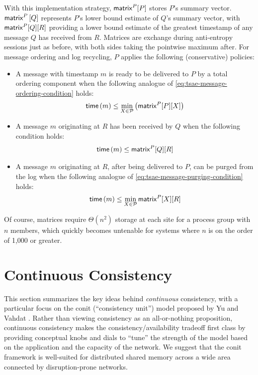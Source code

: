 \documentclass[]             %
{NASA}                       %
\theoremstyle{definition}
\begin{document}
With this implementation strategy, $\mathsf{matrix}^{P}[P]$ stores $P$'s
summary vector. $\mathsf{matrix}^{P}\left[Q\right]$ represents $P$'s lower
bound estimate of $Q$'s summary vector, with $\mathsf{matrix}^{P}[Q][R]$
providing a lower bound estimate of the greatest timestamp of any
message $Q$ has received from $R$. Matrices are exchange during
anti-entropy sessions just as before, with both sides taking the
pointwise maximum after. For message ordering and log recycling, $P$
applies the following (conservative) policies:
\begin{itemize}
\item A message with timestamp $m$ is ready to be delivered to $P$ by a total
  ordering component when the following analogue of \eqref{eq:tsae-message-ordering-condition} holds:
  \begin{equation}
    \mathsf{time}\left(m\right) \leq \min_{X \in \mathcal{P}} \left(\mathsf{matrix}^{P}[P][X]\right)
  \end{equation}
\item A message $m$ originating at $R$ has been
  received by $Q$ when the following condition holds:
    \begin{equation}
      \mathsf{time}\left(m\right) \leq \mathsf{matrix}^{P}[Q][R]
    \end{equation}
\item A message $m$ originating at $R$, after being delivered to $P$,
  can be purged from the log when the following analogue of
  \eqref{eq:tsae-message-purging-condition} holds:
    \begin{equation}
      \mathsf{time}\left(m\right) \leq \min_{X \in \mathcal{P}}\mathsf{matrix}^{P}[X][R]
    \end{equation}
\end{itemize}

Of course, matrices require $\Theta(n^2)$ storage at each site for a
process group with $n$ members, which quickly becomes untenable for
systems where $n$ is on the order of 1,000 or greater.

\section{Continuous Consistency}
\label{sec:continuous-consistency}
This section summarizes the key ideas behind \emph{continuous}
consistency, with a particular focus on the conit (``consistency
unit'') model proposed by Yu and Vahdat
\cite{2000tact,2000tactalgorithms,10.5555/1251229.1251250,DBLP:conf/icdcs/YuV01,2002tact}.
Rather than viewing consistency as an all-or-nothing proposition,
continuous consistency makes the consistency/availability tradeoff
first class by providing conceptual knobs and dials to ``tune'' the
strength of the model based on the application and the capacity of the
network. We suggest that the conit framework is well-suited for
distributed shared memory across a wide area connected by
disruption-prone networks.
\end{document}
